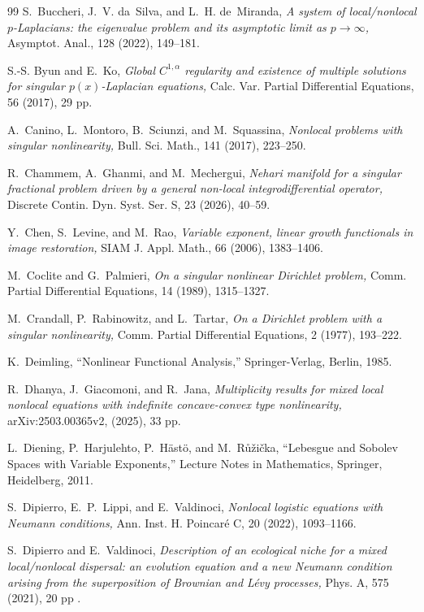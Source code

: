 \documentclass[11pt]{article}
\begin{document}
\begin{thebibliography}{99}
S.~Buccheri, J.~V. da~Silva, and L.~H. de~Miranda,
{\it A system of local/nonlocal {$p$}-{L}aplacians: the eigenvalue problem and its asymptotic limit as {$p\to\infty$},}
Asymptot. Anal., 128 (2022), 149--181.

S.-S. Byun and E.~Ko,
{\it Global {$C^{1,\alpha}$} regularity and existence of multiple
  solutions for singular {$p(x)$}-{L}aplacian equations,}
Calc. Var. Partial Differential Equations, 56 (2017), 29 pp.

A.~Canino, L.~Montoro, B.~Sciunzi, and M.~Squassina,
{\it Nonlocal problems with singular nonlinearity,}
Bull. Sci. Math., 141 (2017), 223--250.

R.~Chammem, A.~Ghanmi, and M.~Mechergui,
{\it Nehari manifold for a singular fractional problem driven by a general non-local integrodifferential operator,}
Discrete Contin. Dyn. Syst. Ser. S, 23 (2026), 40--59.

Y.~Chen, S.~Levine, and M.~Rao,
{\it Variable exponent, linear growth functionals in image restoration,}
SIAM J. Appl. Math., 66 (2006), 1383--1406.

M.~Coclite and G.~Palmieri,
{\it On a singular nonlinear {D}irichlet problem,}
Comm. Partial Differential Equations, 14 (1989), 1315--1327.

M.~Crandall, P.~Rabinowitz, and L.~Tartar,
{\it On a {D}irichlet problem with a singular nonlinearity,}
Comm. Partial Differential Equations, 2 (1977), 193--222.

K.~Deimling,
``Nonlinear Functional Analysis,''
Springer-Verlag, Berlin, 1985.

R.~Dhanya, J.~Giacomoni, and R.~Jana,
{\it Multiplicity results for mixed local nonlocal equations with
  indefinite concave-convex type nonlinearity,} arXiv:2503.00365v2, (2025), 33 pp.

L.~Diening, P.~Harjulehto, P.~H\"ast\"o, and M.~R\r{u}{\v z}i{\v c}ka,
``Lebesgue and {S}obolev Spaces with Variable Exponents,''
 Lecture Notes in Mathematics, Springer, Heidelberg, 2011.

S.~Dipierro, E.~P.~Lippi, and E.~Valdinoci,
{\it {N}onlocal logistic equations with {N}eumann conditions,}
Ann. Inst. H. Poincar\'e C,
  20 (2022), 1093--1166.

S.~Dipierro and E.~Valdinoci,
{\it Description of an ecological niche for a mixed local/nonlocal
  dispersal: an evolution equation and a new {N}eumann condition arising from
  the superposition of {B}rownian and {L}\'evy processes,}
Phys. A, 575 (2021), 20 pp .


\end{thebibliography}
\end{document}
